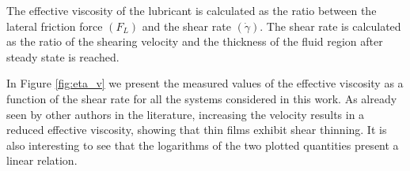 \documentclass[aps,prb,reprint,superscriptaddress, a4paper]{revtex4-1}
\begin{document}
The effective viscosity of the lubricant is calculated as the ratio between the lateral friction force $\left(F_L\right)$ and the shear rate $\left(\dot{\gamma}\right)$. The shear rate is calculated as the ratio of the shearing velocity and the thickness of the fluid region after steady state is reached. 

In Figure \ref{fig:eta_v} we present the measured values of the effective viscosity as a function of the shear rate for all the systems considered in this work.   As already seen by other authors in the literature, increasing the velocity results in a reduced effective viscosity, showing that thin films exhibit shear thinning\cite{Sivebaek2012}. It is also interesting to see that the logarithms of the two plotted quantities present a linear relation.

\end{document}
